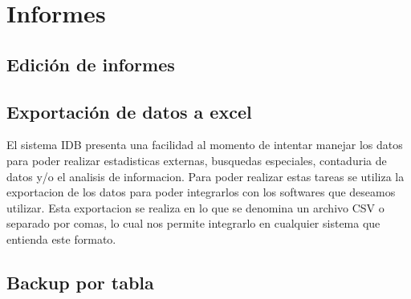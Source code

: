 \documentclass[a4paper,10pt]{article}
\begin{document}
\section{Informes}
\subsection{Edición de informes}
\subsection{Exportación de datos a excel}
El sistema IDB presenta una facilidad al momento de intentar manejar los datos para poder realizar estadisticas externas, busquedas especiales, contaduria de datos y/o el analisis de informacion. Para poder realizar estas tareas se utiliza la exportacion de los datos para poder integrarlos con los softwares que deseamos utilizar. Esta exportacion se realiza en lo que se denomina un archivo CSV o separado por comas, lo cual nos permite integrarlo en cualquier sistema que entienda este formato.

\subsection{Backup por tabla}
\end{document}
